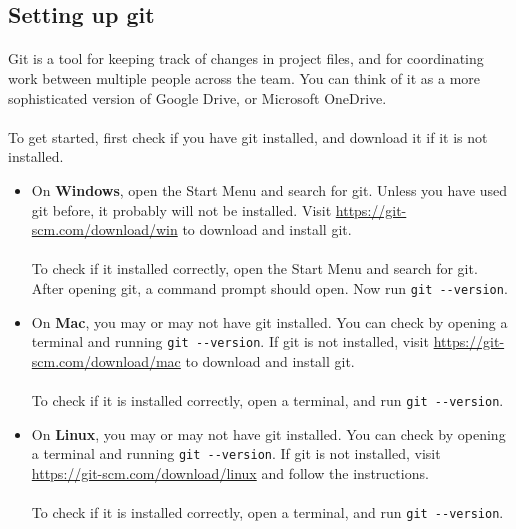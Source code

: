 \documentclass[11pt]{article}
\begin{document}
\subsection{Setting up git}
\paragraph{}
Git is a tool for keeping track of changes in project files, and for coordinating work between multiple people across the team. You can think of it as a more sophisticated version of Google Drive, or Microsoft OneDrive.
\paragraph{}
To get started, first check if you have git installed, and download it if it is not installed.
\begin{itemize}
\item On \textbf{Windows}, open the Start Menu and search for git. Unless you have used git before, it probably will not be installed. Visit \url{https://git-scm.com/download/win} to download and install git.\\\\
To check if it installed correctly, open the Start Menu and search for git. After opening git, a command prompt should open. Now run \lstinline{git --version}.
\item On \textbf{Mac}, you may or may not have git installed. You can check by opening a terminal and running \lstinline{git --version}. If git is not installed, visit \url{https://git-scm.com/download/mac} to download and install git.\\\\
To check if it is installed correctly, open a terminal, and run \lstinline{git --version}.
\item On \textbf{Linux}, you may or may not have git installed. You can check by opening a terminal and running \lstinline{git --version}. If git is not installed, visit \url{https://git-scm.com/download/linux} and follow the instructions.\\\\
To check if it is installed correctly, open a terminal, and run \lstinline{git --version}.
\end{itemize}
\end{document}

